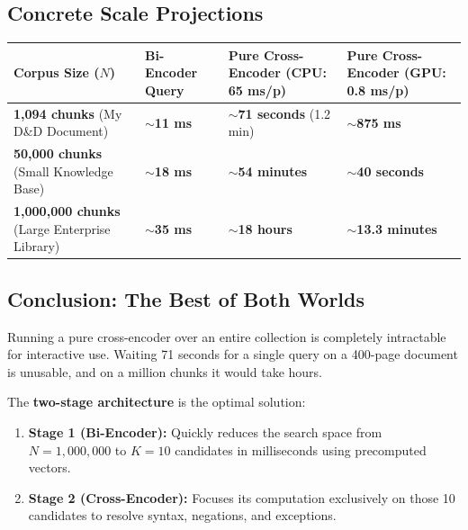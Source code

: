 \documentclass[10pt,a4paper]{article}
\begin{document}
\vspace{-2pt}
\subsection{Concrete Scale Projections}
\begin{table}[h!]
\centering
\small
\renewcommand{\arraystretch}{1.16}
\begin{tabularx}{\textwidth}{@{} Y C{2.8cm} C{4.2cm} C{4.0cm} @{}}
\hline
{}
\textbf{Corpus Size ($N$)} & \textbf{Bi-Encoder Query} & \textbf{Pure Cross-Encoder (CPU: 65 ms/p)} & \textbf{Pure Cross-Encoder (GPU: 0.8 ms/p)} \\
\hline
\textbf{1,094 chunks} (My D\&D Document) & \textbf{$\sim$11 ms} & \textbf{$\sim$71 seconds} (1.2 min) & \textbf{$\sim$875 ms} \\
\textbf{50,000 chunks} (Small Knowledge Base) & \textbf{$\sim$18 ms} & \textbf{$\sim$54 minutes} & \textbf{$\sim$40 seconds} \\
\textbf{1,000,000 chunks} (Large Enterprise Library) & \textbf{$\sim$35 ms} & \textbf{$\sim$18 hours} & \textbf{$\sim$13.3 minutes} \\
\hline
\end{tabularx}
\end{table}

\vspace{-3pt}
\subsection{Conclusion: The Best of Both Worlds}
Running a pure cross-encoder over an entire collection is completely intractable for interactive use. Waiting 71 seconds for a single query on a 400-page document is unusable, and on a million chunks it would take hours.

The \textbf{two-stage architecture} is the optimal solution:
\begin{enumerate}[leftmargin=1.4em, itemsep=1.2pt, topsep=1pt]
  \item \textbf{Stage 1 (Bi-Encoder):} Quickly reduces the search space from $N = 1{,}000{,}000$ to $K = 10$ candidates in milliseconds using precomputed vectors.
  \item \textbf{Stage 2 (Cross-Encoder):} Focuses its computation exclusively on those 10 candidates to resolve syntax, negations, and exceptions.
\end{enumerate}
\end{document}
